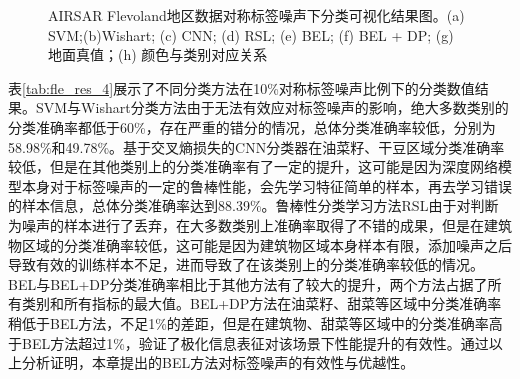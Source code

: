 \begin{figure}[ht]

  \caption{AIRSAR Flevoland地区数据对称标签噪声下分类可视化结果图。(a) SVM;(b)Wishart; (c) CNN; (d) RSL; (e) BEL; (f) BEL + DP; (g) 地面真值；(h) 颜色与类别对应关系}
  \label{fig:fle_res_4}
\end{figure}

表\ref{tab:fle_res_4}展示了不同分类方法在10\%对称标签噪声比例下的分类数值结果。SVM与Wishart分类方法由于无法有效应对标签噪声的影响，绝大多数类别的分类准确率都低于60\%，存在严重的错分的情况，总体分类准确率较低，分别为58.98\%和49.78\%。基于交叉熵损失的CNN分类器在油菜籽、干豆区域分类准确率较低，但是在其他类别上的分类准确率有了一定的提升，这可能是因为深度网络模型本身对于标签噪声的一定的鲁棒性能，会先学习特征简单的样本，再去学习错误的样本信息，总体分类准确率达到88.39\%。鲁棒性分类学习方法RSL由于对判断为噪声的样本进行了丢弃，在大多数类别上准确率取得了不错的成果，但是在建筑物区域的分类准确率较低，这可能是因为建筑物区域本身样本有限，添加噪声之后导致有效的训练样本不足，进而导致了在该类别上的分类准确率较低的情况。BEL与BEL+DP分类准确率相比于其他方法有了较大的提升，两个方法占据了所有类别和所有指标的最大值。BEL+DP方法在油菜籽、甜菜等区域中分类准确率稍低于BEL方法，不足1\%的差距，但是在建筑物、甜菜等区域中的分类准确率高于BEL方法超过1\%，验证了极化信息表征对该场景下性能提升的有效性。通过以上分析证明，本章提出的BEL方法对标签噪声的有效性与优越性。

